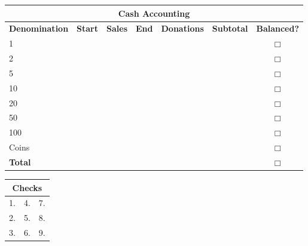 \documentclass[12pt]{article}
\newcommand{\cc}[1]{\cellcolor{#1}}
\newcommand{\ccb}{\cc{blue!12}}
\newcommand{\ccy}{\cc{yellow!35}}
\newcommand{\sep}{1mm}
\begin{document}
\begin{tabular}{| p{1.35in} | r | r | r | p{1.05in} | c | c |}
\hline
\multicolumn{7}{c}{\ccb\textbf{Cash Accounting}}\\
\hline
\textbf{Denomination} & \textbf{Start} & \textbf{Sales} & \textbf{End} & \textbf{Donations} & \textbf{Subtotal} & \textbf{Balanced?}\\[\sep]
\hline\hline
1 & & & & & & $\Box$ \\[\sep]
\hline
2 & & & & & & $\Box$ \\[\sep]
\hline
5 & & & & & & $\Box$ \\[\sep]
\hline
10 & & & & & & $\Box$ \\[\sep]
\hline
20 & & & & & & $\Box$ \\[\sep]
\hline
50 & & & & & & $\Box$ \\[\sep]
\hline
100 & & & & & & $\Box$ \\[\sep]
\hline
Coins & & & & & & $\Box$ \\[\sep]
\hline
\ccy\textbf{Total} &   &  &  &  & & $\Box$ \\[\sep]
\hline
\end{tabular}

\bigskip

\begin{tabular}{p{1.94in} p{1.94in} p{1.94in} }
\hline
\multicolumn{3}{c}{\ccb\textbf{Checks}}\\
\hline
1. & 4. & 7. \\
2. & 5. & 8. \\
3. & 6. & 9. \\
\hline
\end{tabular}
\end{document}
